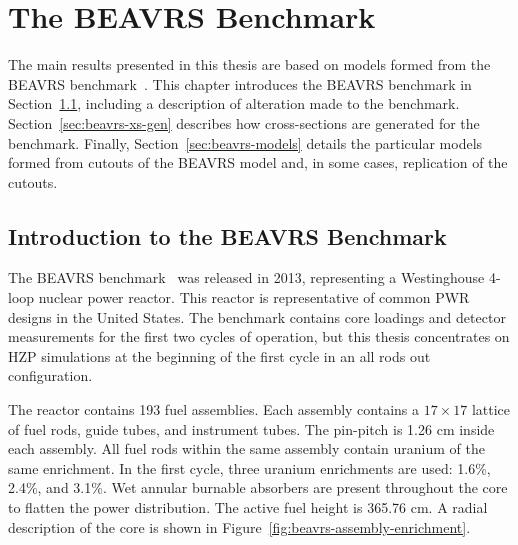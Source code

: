 \chapter{The BEAVRS Benchmark}
\label{chap:beavrs}

The main results presented in this thesis are based on models formed from the BEAVRS benchmark~\cite{horelik2013beavrs}. This chapter introduces the BEAVRS benchmark in Section~\ref{sec:beavrs-intro}, including a description of alteration made to the benchmark. Section~\ref{sec:beavrs-xs-gen} describes how cross-sections are generated for the benchmark. Finally, Section~\ref{sec:beavrs-models} details the particular models formed from cutouts of the BEAVRS model and, in some cases, replication of the cutouts.

\section{Introduction to the BEAVRS Benchmark}
\label{sec:beavrs-intro}

The BEAVRS benchmark~\cite{horelik2013beavrs} was released in 2013, representing a Westinghouse 4-loop nuclear power reactor. This reactor is representative of common \ac{PWR} designs in the United States. The benchmark contains core loadings and detector measurements for the first two cycles of operation, but this thesis concentrates on \ac{HZP} simulations at the beginning of the first cycle in an all rods out configuration.

The reactor contains 193 fuel assemblies. Each assembly contains a $17 \times 17$ lattice of fuel rods, guide tubes, and instrument tubes. The pin-pitch is 1.26 cm inside each assembly. All fuel rods within the same assembly contain uranium of the same enrichment. In the first cycle, three uranium enrichments are used: 1.6\%, 2.4\%, and 3.1\%. Wet annular burnable absorbers are present throughout the core to flatten the power distribution. The active fuel height is 365.76 cm. A radial description of the core is shown in Figure~\ref{fig:beavrs-assembly-enrichment}.


